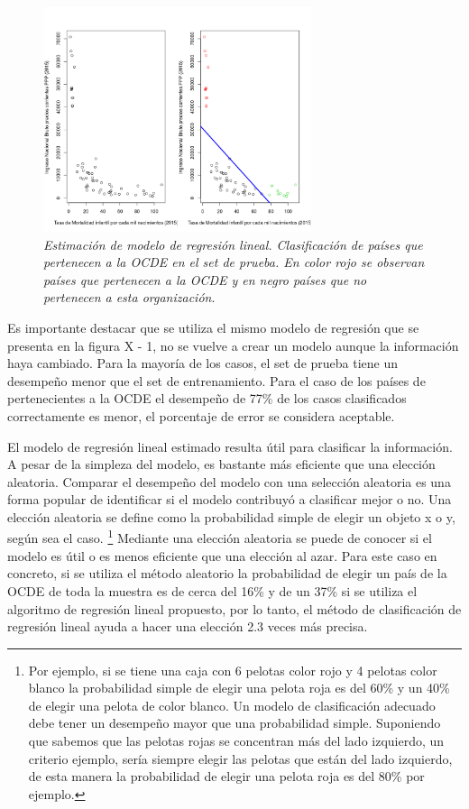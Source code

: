 \documentclass[letterpaper,12pt, spanish, oneside]{book} %
\let\oldfootnote\footnote
\renewcommand{\footnote}[1]{%
  \begingroup%
  \linespread{1.2}%
  \oldfootnote{#1}%
  \endgroup%
}
\begin{document}
\begin{figure}[H]
\centering
\includegraphics[width=0.7\textwidth]{clasificadorlinealentrenamiento.png}
\caption{\label{fig:frog2}\textit{Estimación de modelo de regresión lineal. Clasificación de países que pertenecen a la OCDE en el set de prueba. En color rojo se observan países que pertenecen a la OCDE y en negro países que no pertenecen a esta organización}.}
\end{figure}

Es importante destacar que se utiliza el mismo modelo de regresión que se presenta en la figura X - 1, no se vuelve a crear un modelo aunque la información haya cambiado. Para la mayoría de los casos, el set de prueba tiene un desempeño menor que el set de entrenamiento. Para el caso de los países de pertenecientes a la OCDE el desempeño de 77\% de los casos clasificados correctamente es menor, el porcentaje de error se considera aceptable. 

El modelo de regresión lineal estimado resulta útil para clasificar la información. A pesar de la simpleza del modelo, es bastante más eficiente que una elección aleatoria. Comparar el desempeño del modelo con una selección aleatoria es una forma popular de identificar si el modelo contribuyó a clasificar mejor o no. Una elección aleatoria se define como la probabilidad simple de elegir un objeto x o y, según sea el caso.\footnote{Por ejemplo, si se tiene una caja con 6 pelotas color rojo y 4 pelotas color blanco la probabilidad simple de elegir una pelota roja es del 60\% y un 40\% de elegir una pelota de color blanco. Un modelo de clasificación adecuado debe tener un desempeño mayor que una probabilidad simple. Suponiendo que sabemos que las pelotas rojas se concentran más del lado izquierdo, un criterio ejemplo, sería siempre elegir las pelotas que están del lado izquierdo, de esta manera la probabilidad de elegir una pelota roja es del 80\% por ejemplo.} Mediante una elección aleatoria se puede de conocer si el modelo es útil o es menos eficiente que una elección al azar.  Para este caso en concreto, si se utiliza el método aleatorio la probabilidad de elegir un país de la OCDE de toda la muestra es de cerca del 16\% y de un 37\% si se utiliza el algoritmo de regresión lineal propuesto, por lo tanto, el método de clasificación de regresión lineal ayuda a hacer una elección 2.3 veces más precisa.
\end{document}
